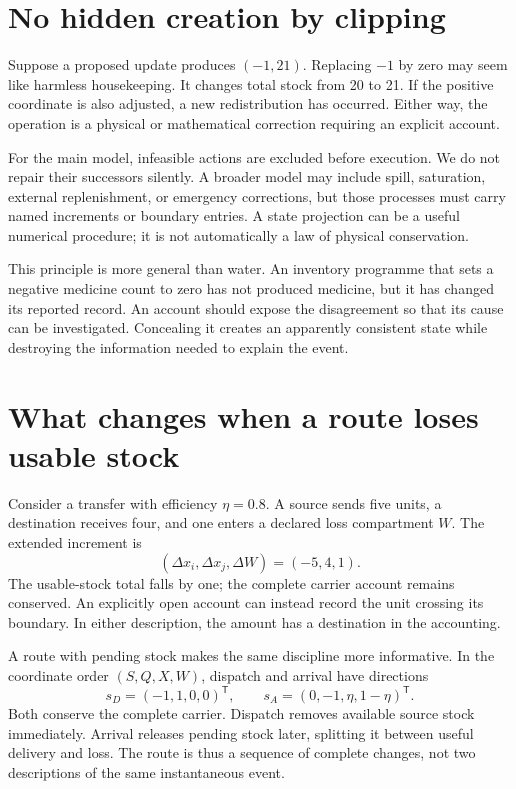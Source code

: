 \section{No hidden creation by clipping}
Suppose a proposed update produces \((-1,21)\). Replacing \(-1\) by zero may seem like harmless housekeeping. It changes total stock from 20 to 21. If the positive coordinate is also adjusted, a new redistribution has occurred. Either way, the operation is a physical or mathematical correction requiring an explicit account.

For the main model, infeasible actions are excluded before execution. We do not repair their successors silently. A broader model may include spill, saturation, external replenishment, or emergency corrections, but those processes must carry named increments or boundary entries. A state projection can be a useful numerical procedure; it is not automatically a law of physical conservation.

This principle is more general than water. An inventory programme that sets a negative medicine count to zero has not produced medicine, but it has changed its reported record. An account should expose the disagreement so that its cause can be investigated. Concealing it creates an apparently consistent state while destroying the information needed to explain the event.

\section{What changes when a route loses usable stock}
Consider a transfer with efficiency $\eta=0.8$. A source sends five units, a destination receives four, and one enters a declared loss compartment $W$. The extended increment is
\begin{equation}
 (\Delta x_i,\Delta x_j,\Delta W)=(-5,4,1).
\end{equation}
The usable-stock total falls by one; the complete carrier account remains conserved. An explicitly open account can instead record the unit crossing its boundary. In either description, the amount has a destination in the accounting.

A route with pending stock makes the same discipline more informative. In the coordinate order $(S,Q,X,W)$, dispatch and arrival have directions
\begin{equation}\label{eq:complete-route-directions}
 s_D=(-1,1,0,0)^{\mathsf T},\qquad
 s_A=(0,-1,\eta,1-\eta)^{\mathsf T}.
\end{equation}
Both conserve the complete carrier. Dispatch removes available source stock immediately. Arrival releases pending stock later, splitting it between useful delivery and loss. The route is thus a sequence of complete changes, not two descriptions of the same instantaneous event.

